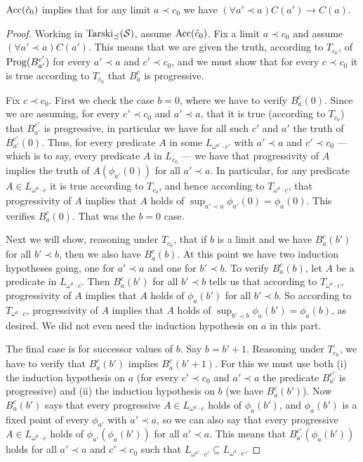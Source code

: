 \documentclass{amsart}
\begin{document}
\begin{lemma}\label{lemma2}
${\rm Acc}(\hat{c}_0)$ implies that for any limit $a \prec c_0$ we have
$(\forall a' \prec a)C(a') \to C(a)$.
\end{lemma}

\begin{proof}
Working in ${\rm Tarski}_{\preceq}(\mathcal{S})$, assume ${\rm Acc}(\hat{c}_0)$.
Fix a limit $a \prec c_0$ and assume $(\forall a' \prec a)C(a')$. This means that we are given the truth,
according to $T_{c_0}$, of ${\rm Prog}(B_{a'}^{c'})$ for every $a' \prec a$ and $c' \prec c_0$, and we
must show that for every $c \prec c_0$ it is true according to $T_{c_0}$ that $B_a^c$ is progressive.

Fix $c \prec c_0$. First we check the case $b = 0$, where we have to
verify $B_a^c(0)$. Since we are assuming, for every $c' \prec c_0$ and $a' \prec a$, that it is true
(according to $T_{c_0}$) that $B_{a'}^{c'}$ is progressive, in particular
we have for all such $c'$ and $a'$ the truth of $B_{a'}^{c'}(0)$. Thus, for every predicate
$A$ in some $L_{\omega^{a'}\cdot c'}$ with $a' \prec a$ and $c' \prec c_0$ --- which is to say, every
predicate $A$ in $L_{c_0}$ --- we have that progressivity of $A$ implies
the truth of $A(\phi_{a'}(0))$ for all $a' \prec a$. In particular, for any predicate
$A \in L_{\omega^a\cdot c}$ it is true according to $T_{c_0}$, and hence according to
$T_{\omega^a\cdot c}$, that
progressivity of $A$ implies that $A$ holds of $\sup_{a' \prec a} \phi_{a'}(0) = \phi_a(0)$.
This verifies $B_a^c(0)$. That was the $b = 0$ case.

Next we will show, reasoning under $T_{c_0}$, that if $b$ is a limit and we have $B_a^c(b')$
for all $b' \prec b$, then we also have $B_a^c(b)$. At this point
we have two induction hypotheses going, one for $a' \prec a$ and one for $b' \prec b$.
To verify $B_a^c(b)$, let $A$ be a predicate in $L_{\omega^a\cdot c}$. Then
$B_a^c(b')$ for all
$b' \prec b$ tells us that according to $T_{\omega^a\cdot c}$, progressivity of $A$ implies that
$A$ holds of $\phi_a(b')$ for all $b' \prec b$. So according to $T_{\omega^a\cdot c}$,
progressivity of $A$
implies that $A$ holds of $\sup_{b' \prec b} \phi_a(b') = \phi_a(b)$, as desired. We
did not even need the induction hypothesis on $a$ in this part.

The final case is for successor values of $b$. Say $b = b' + 1$. Reasoning under $T_{c_0}$, we
have to verify that $B_a^c(b')$ implies $B_a^c(b' + 1)$. For this we must use both
(i) the induction hypothesis on $a$ (for every $c' \prec c_0$ and $a' \prec a$ the predicate
$B_{a'}^{c'}$ is progressive) and (ii) the induction hypothesis on $b$ (we have $B_a^c(b')$).
Now $B_a^c(b')$ says that every progressive $A \in L_{\omega^a\cdot c}$ holds of $\phi_a(b')$,
and $\phi_a(b')$ is a fixed point of every $\phi_{a'}$ with $a' \prec a$, so we can also say
that every progressive $A \in L_{\omega^a\cdot c}$ holds of $\phi_{a'}(\phi_a(b'))$ for
all $a' \prec a$. This means that $B_{a'}^{c'}(\phi_a(b'))$ holds for all $a' \prec a$ and
$c' \prec c_0$ such that $L_{\omega^{a'}\cdot c'} \subseteq L_{\omega^a\cdot c}$.


\end{proof}
\end{document}
